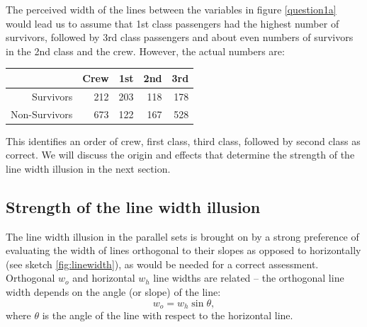 The  perceived width of the lines between the variables in figure \ref{question1a} would  lead us to assume that 1st class passengers had the highest number of survivors, followed by 3rd class passengers and about even numbers of survivors in the 2nd class  and  the crew. However, the  actual numbers are:
%
\begin{center}
\begin{tabular}{rrrrr}
& Crew & 1st & 2nd & 3rd \\ \hline
Survivors & 212 & 203 & 118 & 178\\
Non-Survivors & 673 & 122 & 167 &  528  
\end{tabular}
\end{center}
This identifies an order of crew, first class, third class, followed by second class as correct. We will discuss the origin and effects that determine the strength of the line width illusion in the next section.
%
\subsection{Strength of the line width illusion}\label{distortion}

The line width illusion in the parallel sets is brought on by a strong preference of evaluating the width of lines orthogonal to their slopes as opposed to horizontally (see sketch \ref{fig:linewidth}), as would be needed for a correct assessment.
Orthogonal $w_o$ and horizontal $w_h$ line widths are related -- the orthogonal line width depends on the angle (or slope) of the line:
\begin{equation}\label{adjust}
w_o = w_h \sin \theta,
\end{equation}
where $\theta$ is the angle of the line with respect to the horizontal line.

